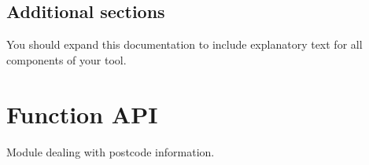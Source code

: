 \documentclass[letterpaper,10pt,english]{sphinxmanual}
\begin{document}
\section{Additional sections}
\label{\detokenize{index:additional-sections}}
\sphinxAtStartPar
You should expand this documentation to include explanatory text for all components of your tool.


\chapter{Function API}
\label{\detokenize{index:module-locator}}\label{\detokenize{index:function-api}}
\sphinxAtStartPar
Module dealing with postcode information.
\end{document}
